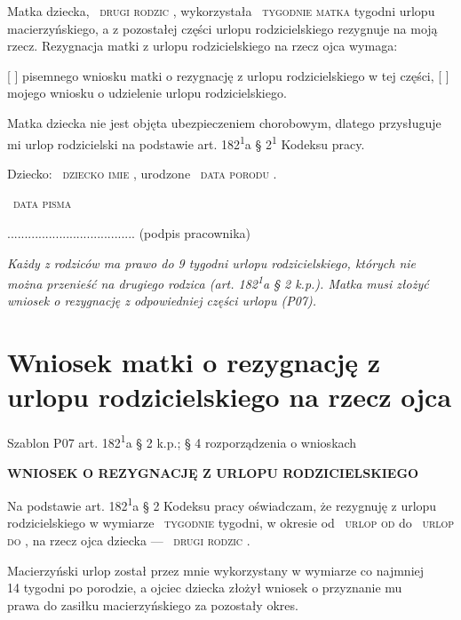 \documentclass[11pt,a4paper]{article}
\newcommand{\Pole}[1]{%
  \textcolor{szary}{\dotfill}\,%
  {\scriptsize\textcolor{szary}{\textsc{#1}}}%
}
\newenvironment{warunek}[1]{%
  \par\smallskip\noindent\begin{minipage}{\linewidth}%
  \color{black}%
}{%
  \end{minipage}\par\smallskip%
}
\newcommand{\NaglowekPisma}[1]{%
  \par\vspace{0.8em}%
  \begin{center}%
    {\large\bfseries\MakeUppercase{#1}}%
  \end{center}%
  \vspace{0.4em}%
}
\begin{document}
Matka dziecka, \Pole{drugi rodzic}, wykorzystała \Pole{tygodnie matka} tygodni urlopu
macierzyńskiego, a z pozostałej części urlopu rodzicielskiego rezygnuje na
moją rzecz. Rezygnacja matki z urlopu rodzicielskiego na rzecz ojca wymaga:

[ ] pisemnego wniosku matki o rezygnację z urlopu rodzicielskiego w tej części,
[ ] mojego wniosku o udzielenie urlopu rodzicielskiego.

\begin{warunek}{jesli_matka_nieubezpieczona}
Matka dziecka nie jest objęta ubezpieczeniem chorobowym, dlatego przysługuje\\[-2pt]
mi urlop rodzicielski na podstawie art. 182\textsuperscript{1}a \S{} 2\textsuperscript{1} Kodeksu pracy.
\end{warunek}

Dziecko: \Pole{dziecko imie}, urodzone \Pole{data porodu}.

\Pole{data pisma}
.....................................
(podpis pracownika)

\vfill
{\footnotesize\color{szary}\itshape Każdy z rodziców ma prawo do 9 tygodni urlopu rodzicielskiego, których nie można przenieść na drugiego rodzica (art. 182\textsuperscript{1}a \S{} 2 k.p.). Matka musi złożyć wniosek o rezygnację z odpowiedniej części urlopu (P07). }

\clearpage

\section{Wniosek matki o rezygnację z urlopu rodzicielskiego na rzecz ojca}

{\small\color{szary}Szablon P07 \textbullet{} art. 182\textsuperscript{1}a \S{} 2 k.p.; \S{} 4 rozporządzenia o wnioskach}

\NaglowekPisma{WNIOSEK O REZYGNACJĘ Z URLOPU RODZICIELSKIEGO}

Na podstawie art. 182\textsuperscript{1}a \S{} 2 Kodeksu pracy oświadczam, że rezygnuję z urlopu
rodzicielskiego w wymiarze \Pole{tygodnie} tygodni, w okresie od \Pole{urlop od} do \Pole{urlop do},
na rzecz ojca dziecka --- \Pole{drugi rodzic}.

\begin{warunek}{jesli_po_14_tyg}
Macierzyński urlop został przez mnie wykorzystany w wymiarze co najmniej\\[-2pt]
14 tygodni po porodzie, a ojciec dziecka złożył wniosek o przyznanie mu\\[-2pt]
prawa do zasiłku macierzyńskiego za pozostały okres.
\end{warunek}
\end{document}
